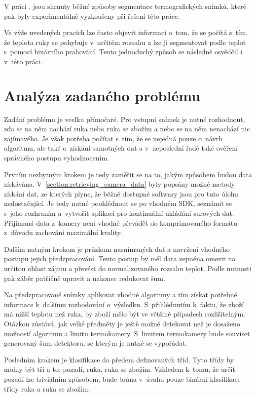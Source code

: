 V práci \cite{duarte2014segmentation}, jsou shrnuty běžné způsoby segmentace termografických snímků, které pak byly experimentálně vyzkoušeny při řešení této práce.

Ve výše uvedených pracích lze často objevit informaci o~tom, že se počítá s~tím, že teplota ruky se pohybuje v~určitém rozsahu a lze ji segmentovat podle teplot s~pomocí binárního prahování. Tento jednoduchý způsob se následně osvědčil i v~této práci.

\section{Analýza zadaného problému}
Zadání problému je vcelku přímočaré. Pro vstupní snímek je nutné rozhodnout, zda se na něm nachází ruka nebo ruka se zbožím a nebo se na něm nenachází nic zajímavého. Je však potřeba počítat s~tím, že se nejedná pouze o~návrh algoritmu, ale také o~získání samotných dat a v~neposlední řadě také ověření správného postupu vyhodnocením. 

Prvním nezbytným krokem je tedy zaměřit se na to, jakým způsobem budou data získávána. V~\ref{section:retrieving_camera_data} byly popsány možné metody získání dat, ze kterých plyne, že běžně dostupné softwary jsou pro tuto úlohu nedostačující. Je tedy nutné poohlédnout se po vhodném SDK, seznámit se s~jeho rozhraním a~vytvořit aplikaci pro kontinuální ukládání surových dat. Přijímaná data z~kamery není vhodné převádět do komprimovaného formátu z~důvodu zachování maximální kvality.

Dalším nutným krokem je průzkum nasnímaných dat a navržení vhodného postupu jejich předzpracování. Tento postup by měl data zejména omezit na určitou oblast zájmu a převést do normalizovaného rozsahu teplot. Podle nutnosti pak záběr patřičně upravit a nakonec redukovat šum.

Na předzpracované snímky aplikovat vhodné algoritmy a tím získat potřebné informace k~dalšímu rozhodování o~výsledku. S~přihlédnutím k~faktu, že zboží má nižší teplotu než ruka, by zboží mělo být ve většině případech rozlišitelným. Otázkou zůstává, jak velké předměty je ještě možné detekovat než je dosaženo možností algoritmu a limitu termokamery. S~limitem termokamery bude souviset generovaný šum detektoru, se kterým je nutné se vypořádat. 

Posledním krokem je klasifikace do předem definovaných tříd. Tyto třídy by mohly být tři a to: pozadí, ruka, ruka se zbožím. Vzhledem k~tomu, že určit pozadí lze triviálním způsobem, bude brána v~úvahu pouze binární klasifikace třídy ruka a ruka se zbožím.

